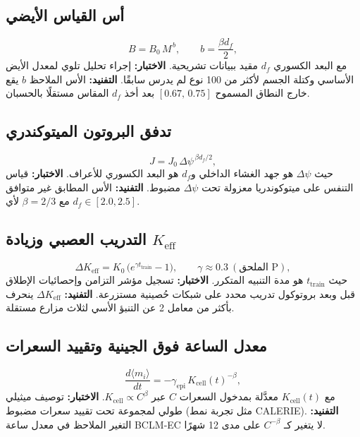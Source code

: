 \documentclass[11pt,a4paper]{article}
\begin{document}
	\subsection{أس القياس الأيضي}
	
	\begin{equation}\label{eq:pred-metab}
		B = B_0\,M^{\,b}, \qquad
		b = \frac{\beta d_f}{2},
	\end{equation}
	مع البعد الكسوري \(d_f\) مقيد ببيانات تشريحية.
	\textbf{الاختبار:} إجراء تحليل تلوي لمعدل الأيض الأساسي وكتلة الجسم لأكثر من 100 نوع لم يدرس سابقًا.
	\textbf{التفنيد:} الأس الملاحظ \(b\) يقع خارج النطاق المسموح \([0.67,\,0.75]\) بعد أخذ \(d_f\) المقاس مستقلًا بالحسبان.
	
	\subsection{تدفق البروتون الميتوكندري}
	
	\begin{equation}\label{eq:pred-mito}
		J = J_0\,\Delta\psi^{\,\beta d_f/2},
	\end{equation}
	حيث \(\Delta\psi\) هو جهد الغشاء الداخلي و\(d_f\) هو البعد الكسوري للأعراف.
	\textbf{الاختبار:} قياس التنفس على ميتوكوندريا معزولة تحت \(\Delta\psi\) مضبوط.
	\textbf{التفنيد:} الأس المطابق غير متوافق مع \(\beta=2/3\) لأي \(d_f\in[2.0,2.5]\).
	
	\subsection{التدريب العصبي وزيادة \(K_{\mathrm{eff}}\)}
	
	\begin{equation}\label{eq:pred-neural}
		\Delta K_{\mathrm{eff}} = K_0\,
		\bigl(e^{\gamma t_{\mathrm{train}}}-1\bigr),\qquad
		\gamma \approx 0.3\ (\text{الملحق~P}),
	\end{equation}
	حيث \(t_{\mathrm{train}}\) هو مدة التنبيه المتكرر.
	\textbf{الاختبار:} تسجيل مؤشر التزامن وإحصائيات الإطلاق قبل وبعد بروتوكول تدريب محدد على شبكات حُصينية مستزرعة.
	\textbf{التفنيد:} \(\Delta K_{\mathrm{eff}}\) ينحرف بأكثر من معامل 2 عن التنبؤ الأسي لثلاث مزارع مستقلة.
	
	\subsection{معدل الساعة فوق الجينية وتقييد السعرات}
	
	\begin{equation}\label{eq:pred-epi}
		\frac{d\langle m_i\rangle}{dt} =
		-\gamma_{\mathrm{epi}}\, K_{\mathrm{cell}}(t)^{-\beta},
	\end{equation}
	مع \(K_{\mathrm{cell}}(t)\) معدَّلة بمدخول السعرات \(C\) عبر
	\(K_{\mathrm{cell}} \propto C^{\beta}\).
	\textbf{الاختبار:} توصيف ميثيلي طولي لمجموعة تحت تقييد سعرات مضبوط (مثل تجربة نمط CALERIE).
	\textbf{التفنيد:} التغير الملاحظ في معدل ساعة BCLM‑EC لا يتغير كـ \(C^{-\beta}\) على مدى 12 شهرًا.
	
\end{document}
